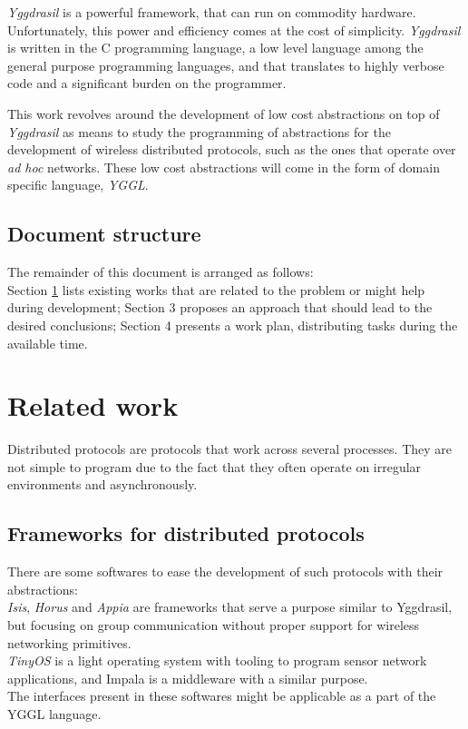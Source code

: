 \documentclass[runningheads]{../llncs}
\begin{document}
\textit{Yggdrasil} is a powerful framework, that can run on commodity hardware. Unfortunately, this power and efficiency comes at the cost of simplicity.
\textit{Yggdrasil} is written in the C programming language, a low level language among the general purpose programming languages, and that translates to highly verbose code and a significant burden on the programmer.
\par This work revolves around the development of low cost abstractions on top of \textit{Yggdrasil} as means to study the programming of abstractions for the development of wireless distributed protocols, such as the ones that operate over \textit{ad hoc} networks.
These low cost abstractions will come in the form of domain specific language, \textit{YGGL}.
\subsection*{Document structure}
The remainder of this document is arranged as follows:\\
Section \ref{related} lists existing works that are related to the problem or might help during development; Section 3 proposes an approach that should lead to the desired conclusions; Section 4 presents a work plan, distributing tasks during the available time.

\section{Related work}
\label{related}
Distributed protocols are protocols that work across several processes. They are not simple to program due to the fact that they often operate on irregular environments and asynchronously.
\subsection*{Frameworks for distributed protocols}
There are some softwares to ease the development of such protocols with their abstractions:\\
\textit{Isis}\cite{ISIS:1990}, \textit{Horus}\cite{Horus:1994} and \textit{Appia}\cite{Appia:2001} are frameworks that serve a purpose similar to Yggdrasil, but focusing on group communication without proper support for wireless networking primitives.\\
\textit{TinyOS}\cite{TinyOS:2005} is a light operating system with tooling to program sensor network applications, and  Impala\cite{Impala:2003} is a middleware with a similar purpose.\\
The interfaces present in these softwares might be applicable as a part of the YGGL language.
\end{document}
